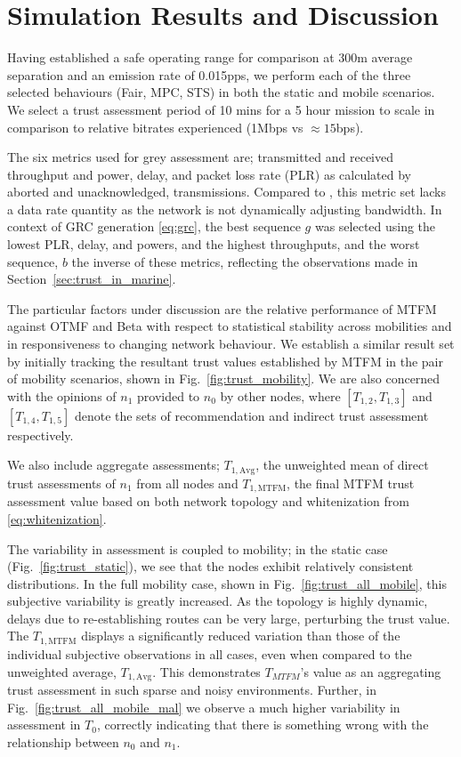 \section{Simulation Results and Discussion}\label{sec:trustresultsanddiscussion}

Having established a safe operating range for comparison at 300m average separation and an emission rate of 0.015pps, we perform each of the three selected behaviours (Fair, MPC, STS) in both the static and mobile scenarios. 
We select a trust assessment period of 10 mins for a 5 hour mission to scale in comparison to relative bitrates experienced (1Mbps vs $\approx15$bps).

The six metrics used for grey assessment are; transmitted and received throughput and power, delay, and packet loss rate (PLR) as calculated by aborted and unacknowledged, transmissions.
Compared to \cite{Guo11}, this metric set lacks a data rate quantity as the network is not dynamically adjusting bandwidth.
In context of GRC generation \eqref{eq:grc}, the best sequence $g$ was selected using the lowest PLR, delay, and powers, and the highest throughputs, and the worst sequence, $b$ the inverse of these metrics, reflecting the observations made in Section~\ref{sec:trust_in_marine}.

The particular factors under discussion are the relative performance of MTFM against OTMF and Beta with respect to statistical stability across mobilities and in responsiveness to changing network behaviour. 
We establish a similar result set by initially tracking the resultant trust values established by MTFM in the pair of mobility scenarios, shown in Fig.~\ref{fig:trust_mobility}.
We are also concerned with the opinions of $n_1$ provided to $n_0$ by other nodes, where $[T_{1,2},T_{1,3}]$ and $[T_{1,4},T_{1,5}]$ denote the sets of recommendation and indirect trust assessment respectively.

We also include aggregate assessments; $T_{1,\text{Avg}}$, the unweighted mean of direct trust assessments of $n_1$ from all nodes and $T_{1,\text{MTFM}}$, the final MTFM trust assessment value based on both network topology and whitenization from \eqref{eq:whitenization}.

The variability in assessment is coupled to mobility; in the static case (Fig.~\ref{fig:trust_static}), we see that the nodes exhibit relatively consistent distributions.
In the full mobility case, shown in Fig.~\ref{fig:trust_all_mobile}, this subjective variability is greatly increased. 
As the topology is highly dynamic, delays due to re-establishing routes can be very large, perturbing the trust value.
The $T_{1,\text{MTFM}}$ displays a significantly reduced variation than those of the individual subjective observations in all cases, even when compared to the unweighted average, $T_{1,\text{Avg}}$.
This demonstrates $T_{MTFM}$'s value as an aggregating trust assessment in such sparse and noisy environments.
Further, in Fig.~\ref{fig:trust_all_mobile_mal} we observe a much higher variability in assessment in $T_0$, correctly indicating that there is something wrong with the relationship between $n_0$ and $n_1$.

